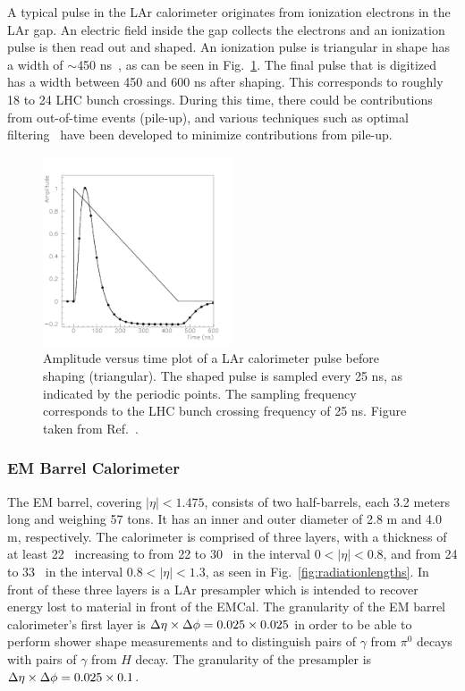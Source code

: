 {A typical pulse in the LAr calorimeter originates from ionization electrons in the LAr gap. An electric field inside the gap collects the electrons and an ionization pulse is then read out and shaped. An ionization pulse is triangular in shape has a width of $\sim$450 ns~\cite{Nikiforou:2013nba}, as can be seen in Fig.~\ref{fig:larsignal}. The final pulse that is digitized has a width between 450 and 600 ns after shaping. This corresponds to roughly 18 to 24 LHC bunch crossings. During this time, there could be contributions from out-of-time events (pile-up), and various techniques such as optimal filtering~\cite{OliveiraDamazio:1630826} have been developed to minimize contributions from pile-up.

\begin{figure}[ht]
	\centerline{
		\includegraphics[width=0.5\textwidth]{figures/lar_signal.pdf} 
	}
	\caption{Amplitude versus time plot of a LAr calorimeter pulse before shaping (triangular). The shaped pulse is sampled every 25 ns, as indicated by the periodic points. The sampling frequency corresponds to the LHC bunch crossing frequency of 25 ns. Figure taken from Ref.~\cite{Aad:2008zzm}.}
	\label{fig:larsignal}
\end{figure}

\subsubsection{EM Barrel Calorimeter}
The EM barrel, covering $|\eta|<1.475$, consists of two half-barrels, each 3.2 meters long and weighing 57 tons. It has an inner and outer diameter of 2.8 m and 4.0 m, respectively. The calorimeter is comprised of three layers, with a thickness of at least 22 \radlen\, increasing to from 22 to 30 \radlen\ in the interval $0<|\eta|<0.8$, and from 24 to 33 \radlen\ in the interval $0.8<|\eta|<1.3$, as seen in Fig.~\ref{fig:radiationlengths}. In front of these three layers is a LAr presampler which is intended to recover energy lost to material in front of the EMCal. The granularity of the EM barrel calorimeter's first layer is $\mbox{$\Delta \eta$}\times\mbox{$\Delta \phi$}=0.025\times0.025$ in order to be able to perform shower shape measurements and to distinguish pairs of $\gamma$ from $\pi^{0}$ decays with pairs of $\gamma$ from $H$ decay. The granularity of the presampler is $\mbox{$\Delta \eta$}\times\mbox{$\Delta \phi$}=0.025\times0.1$. 


}
